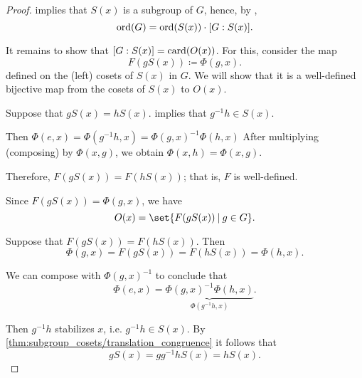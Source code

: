 \begin{proof}
   implies that \( S(x) \) is a subgroup of \( G \), hence, by ,
  \begin{equation*}
    \operatorname{ord}(G) = \operatorname{ord}(S(x)) \cdot [G: S(x)].
  \end{equation*}

  It remains to show that \( [G: S(x)] = \operatorname{card}(O(x)) \). For this, consider the map
  \begin{equation*}
    F(g S(x)) \coloneqq \Phi(g, x).
  \end{equation*}
  defined on the (left) cosets of \( S(x) \) in \( G \). We will show that it is a well-defined bijective map from the cosets of \( S(x) \) to \( O(x) \).

   Suppose that \( g S(x) = h S(x) \).  implies that \( g^{-1} h \in S(x) \).

  Then \( \Phi(e, x) = \Phi(g^{-1} h, x) = \Phi(g, x)^{-1} \Phi(h, x) \) After multiplying (composing) by \( \Phi(x, g) \), we obtain \( \Phi(x, h) = \Phi(x, g) \).

  Therefore, \( F(g S(x)) = F(h S(x)) \); that is, \( F \) is well-defined.

   Since \( F(g S(x)) = \Phi(g, x) \), we have
  \begin{equation*}
    O(x) = \set{ F(g S(x)) \given g \in G }.
  \end{equation*}

   Suppose that \( F(g S(x)) = F(h S(x)) \). Then
  \begin{equation*}
    \Phi(g, x) = F(g S(x)) = F(h S(x)) = \Phi(h, x).
  \end{equation*}

  We can compose with \( \Phi(g, x)^{-1} \) to conclude that
  \begin{equation*}
    \Phi(e, x) = \underbrace{\Phi(g, x)^{-1} \Phi(h, x)}_{\Phi(g^{-1} h, x)}.
  \end{equation*}

  Then \( g^{-1} h \) stabilizes \( x \), i.e. \( g^{-1} h \in S(x) \). By \cref{thm:subgroup_cosets/translation_congruence} it follows that
  \begin{equation*}
    g S(x) = g g^{-1} h S(x) = h S(x).
  \end{equation*}
\end{proof}
